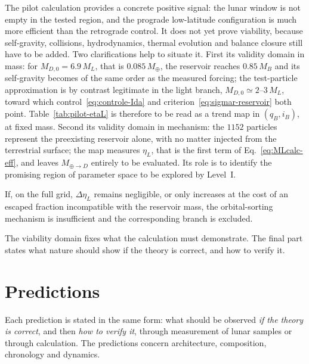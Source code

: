 \documentclass[11pt,a4paper,openany]{report}
\newcommand{\Mt}{M_{\oplus}}
\begin{document}
\begin{controle}
The pilot calculation provides a concrete positive signal: the lunar window is not empty in the
tested region, and the prograde low-latitude configuration is much more efficient than the
retrograde control. It does not yet prove viability, because self-gravity, collisions,
hydrodynamics, thermal evolution and balance closure still have to be added. Two clarifications
help to situate it. First its validity domain in mass: for $M_{D,0}=6.9\,M_L$, that is
$0.085\,\Mt$, the reservoir reaches $0.85\,M_B$ and its self-gravity becomes of the same order as
the measured forcing; the test-particle approximation is by contrast legitimate in the light
branch, $M_{D,0}\simeq2$--$3\,M_L$, toward which control~\eqref{eq:controle-Ida} and
criterion~\eqref{eq:sigmar-reservoir} both point. Table~\ref{tab:pilot-etaL} is therefore to be read
as a trend map in $(q_B,i_B)$, at fixed mass. Second its validity domain in mechanism: the $1152$
particles represent the preexisting reservoir alone, with no matter injected from the terrestrial
surface; the map measures $\eta_L$, that is the first term of Eq.~\eqref{eq:MLcalc-eff}, and leaves
$M_{\oplus\to D}$ entirely to be evaluated. Its role is to identify
the promising region of parameter space to be explored by Level~I.
\end{controle}

\begin{falsif}
If, on the full grid, $\Delta\eta_L$ remains negligible, or only increases at the cost of an escaped
fraction incompatible with the reservoir mass, the orbital-sorting mechanism is insufficient and
the corresponding branch is excluded.
\end{falsif}

\begin{rappel}
The viability domain fixes what the calculation must demonstrate. The final part states what
nature should show if the theory is correct, and how to verify it.
\end{rappel}

\part{Predictions}
\label{part:predictions}

\noindent
Each prediction is stated in the same form: what should be observed \emph{if the theory is correct},
and then \emph{how to verify it}, through measurement of lunar samples or through calculation. The
predictions concern architecture, composition, chronology and dynamics.
\end{document}
